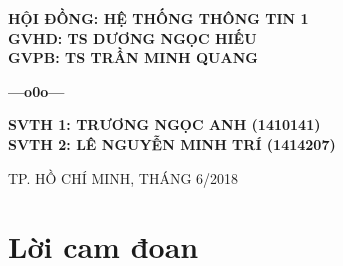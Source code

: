 \documentclass[12pt]{report}
\begin{document}
\begin{titlepage}
\vspace{15mm}

\begin{addmargin}[100pt]{0pt}
\textbf{{\fontsize{15}{15}\selectfont HỘI ĐỒNG: HỆ THỐNG THÔNG TIN 1}}\\
\textbf{{\fontsize{15}{15}\selectfont GVHD: TS DƯƠNG NGỌC HIẾU}}\\
\textbf{{\fontsize{15}{15}\selectfont GVPB: TS TRẦN MINH QUANG}}
\begin{center}
\textbf{{\fontsize{15}{15}\selectfont ---o0o---}}
\end{center}
\textbf{{\fontsize{15}{15}\selectfont SVTH 1: TRƯƠNG NGỌC ANH (1410141)}}\\
\textbf{{\fontsize{15}{15}\selectfont SVTH 2: LÊ NGUYỄN MINH TRÍ (1414207)}}\\

\end{addmargin}
\null\vfill
\begin{center}
        TP. HỒ CHÍ MINH, THÁNG 6/2018
\end{center}

\thispagestyle{empty}
\end{titlepage}
%
\tableofcontents

%

%
\listoffigures
\listoftables
\chapter*{Lời cam đoan}
\end{document}
